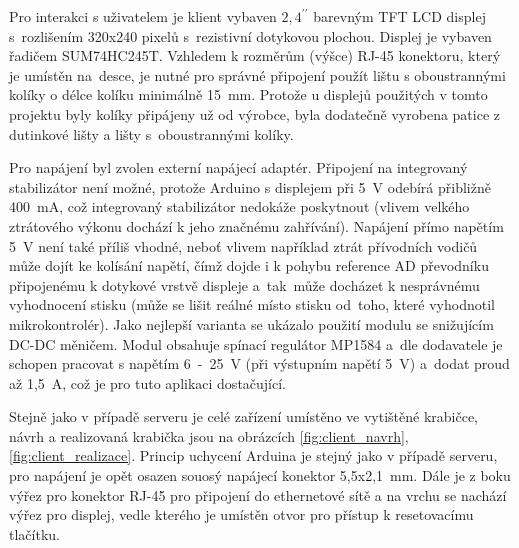 Pro interakci s uživatelem je klient vybaven $2,4^{\prime\prime}$ barevným TFT LCD displej s~rozlišením 320x240 pixelů s~rezistivní dotykovou plochou. Displej je vybaven  řadičem SUM74HC245T. Vzhledem k rozměrům (výšce) RJ-45 konektoru, který je umístěn na~desce, je nutné pro správné připojení použít lištu s oboustrannými kolíky o délce kolíku minimálně 15~mm. Protože u displejů použitých v tomto projektu byly kolíky připájeny už od výrobce, byla dodatečně vyrobena patice z dutinkové lišty a lišty s~oboustrannými kolíky.

Pro napájení byl zvolen externí napájecí adaptér. Připojení na integrovaný stabilizátor není možné, protože Arduino s displejem při 5~V odebírá přibližně 400~mA, což integrovaný stabilizátor nedokáže poskytnout (vlivem velkého ztrátového výkonu dochází k jeho značnému zahřívání). Napájení přímo napětím 5~V není také příliš vhodné, neboť vlivem například ztrát přívodních vodičů může dojít ke kolísání napětí, čímž dojde i k pohybu reference AD převodníku připojenému k dotykové vrstvě displeje a~tak~může docházet k nesprávnému vyhodnocení stisku (může se lišit reálné místo stisku od~toho, které vyhodnotil mikrokontrolér). Jako nejlepší varianta se ukázalo použití modulu se snižujícím DC-DC měničem. Modul obsahuje spínací regulátor MP1584 a~dle dodavatele je schopen pracovat s napětím 6~-~25~V (při výstupním napětí 5~V) a~dodat proud až 1,5~A, což je pro tuto aplikaci dostačující.

Stejně jako v případě serveru je celé zařízení umístěno ve vytištěné krabičce, návrh a realizovaná krabička jsou na obrázcích \ref{fig:client_navrh}, \ref{fig:client_realizace}. Princip uchycení Arduina je stejný jako v případě serveru, pro napájení je opět osazen souosý napájecí konektor 5,5x2,1~mm. Dále je z boku výřez pro konektor RJ-45 pro připojení do ethernetové sítě a na vrchu se nachází výřez pro displej, vedle kterého je umístěn otvor pro přístup k resetovacímu tlačítku.

